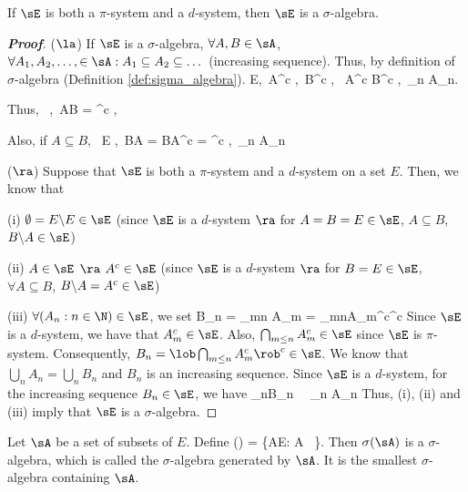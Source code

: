 \begin{lemma}\label{lem:pi_d_sigma_algebra}
If $\sE$ is both a $\pi$-system and a $d$-system, then $\sE$ is a $\sigma$-algebra.
\end{lemma}

\begin{proof}[\bf Proof]
($\la$) If $\sE$ is a $\sigma$-algebra, $\forall A,B\in \sA$, $\forall A_1,A_2,\dots,\in \sA: A_1\subseteq A_2\subseteq \dots$ (increasing sequence). Thus, by definition of $\sigma$-algebra (Definition \ref{def:sigma_algebra}).
\be
E\in \sE,\ A^c \in \sE,\ B^c \in \sE, \ A^c \cup B^c \in \sE,\ \bigcup_n A_n\in \sE.
\ee

Thus,
\be
{}\ \emptyset \in \sE,\quad {}\ A\cap B = ^c \in \sE,\quad\quad \ra\quad \sE {}
\ee

Also, if $A\subseteq B$,
\be
{}\ E \in \sE,\quad {}\ B\bs A = B\cap A^c = ^c \in \sE,\quad {}\ \bigcup_n A_n\in \sE \quad\quad\ra\quad \sE {}
\ee


($\ra$) Suppose that $\sE$ is both a $\pi$-system and a $d$-system on a set $E$. Then, we know that
\ben
\item [(i)] $\emptyset = E\backslash E \in \sE$ (since $\sE$ is a $d$-system $\ra$ for $A=B=E\in \sE$, $A\subseteq B$, $B\backslash A \in \sE$)
\item [(ii)] $A\in \sE$ $\ra$ $A^c\in\sE$ (since $\sE$ is a $d$-system $\ra$ for $B=E\in \sE$, $\forall A\subseteq B$, $B\backslash A = A^c\in \sE$)
\item [(iii)] $\forall (A_n:n\in\N)\in \sE$, we set
\be
B_n = \bigcup_{m\leq n} A_m = \lob \bigcap_{m\leq n}A_m^c\rob^c
\ee
Since $\sE$ is a $d$-system, we have that $A_m^c\in \sE$. Also, $\bigcap_{m\leq n}A_m^c\in \sE$ since $\sE$ is $\pi$-system. Consequently, $B_n = \lob \bigcap_{m\leq n}A_m^c\rob^c\in\sE$. We know that $\bigcup\limits_n A_n = \bigcup\limits_n B_n$ and $B_n$ is an increasing sequence. Since $\sE$ is a $d$-system, for the increasing sequence $B_n\in\sE$, we have
\be
\bigcup\limits_nB_n \in\sE \ \ra \ \bigcup\limits_n A_n \in \sE
\ee
\een
Thus, (i), (ii) and (iii) imply that $\sE$ is a $\sigma$-algebra.
\end{proof}

\begin{definition}
Let $\sA$ be a set of subsets of $E$. Define
\be
\sigma(\sA) = \{A\subseteq E: A \in \sE \ \}.
\ee
Then $\sigma(\sA)$ is a $\sigma$-algebra, which is called the $\sigma$-algebra generated by $\sA$. It is the smallest $\sigma$-algebra containing $\sA$.
\end{definition}

